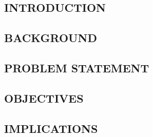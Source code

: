 \begin{center}
		\chapter{INTRODUCTION}
	\end{center}
	
	
	\section{BACKGROUND}
	\section{PROBLEM STATEMENT}
	\section{OBJECTIVES}
	\section{IMPLICATIONS}